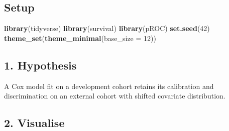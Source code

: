 \documentclass[
]{article}
\newenvironment{Shaded}{\begin{snugshade}}{\end{snugshade}}
\newcommand{\AttributeTok}[1]{\textcolor[rgb]{0.13,0.29,0.53}{#1}}
\newcommand{\DecValTok}[1]{\textcolor[rgb]{0.00,0.00,0.81}{#1}}
\newcommand{\FunctionTok}[1]{\textcolor[rgb]{0.13,0.29,0.53}{\textbf{#1}}}
\newcommand{\NormalTok}[1]{#1}
\begin{document}
\subsection{Setup}\label{setup}

\begin{Shaded}
\begin{Highlighting}[]
\FunctionTok{library}\NormalTok{(tidyverse)}
\FunctionTok{library}\NormalTok{(survival)}
\FunctionTok{library}\NormalTok{(pROC)}
\FunctionTok{set.seed}\NormalTok{(}\DecValTok{42}\NormalTok{)}
\FunctionTok{theme\_set}\NormalTok{(}\FunctionTok{theme\_minimal}\NormalTok{(}\AttributeTok{base\_size =} \DecValTok{12}\NormalTok{))}
\end{Highlighting}
\end{Shaded}

\subsection{1. Hypothesis}\label{hypothesis}

A Cox model fit on a development cohort retains its calibration and
discrimination on an external cohort with shifted covariate
distribution.

\subsection{2. Visualise}\label{visualise}
\end{document}
